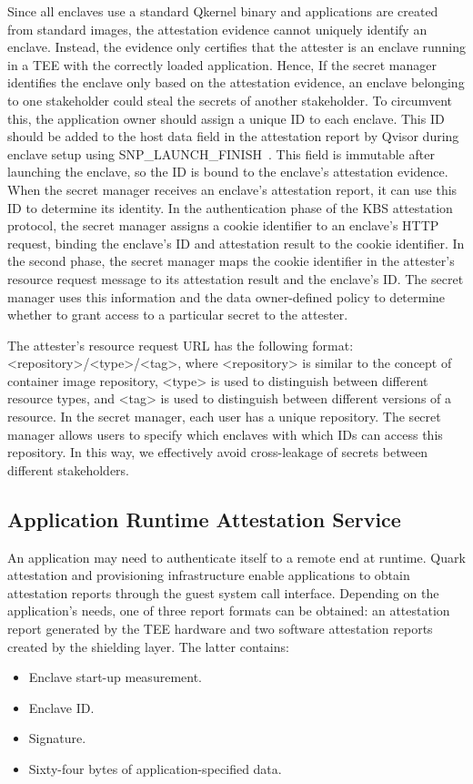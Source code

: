 Since all enclaves use a standard Qkernel binary and applications are created from standard images, the attestation evidence cannot uniquely identify an enclave. Instead, the evidence only certifies that the attester is an enclave running in a 
TEE with the correctly loaded application. Hence, If the secret manager identifies the enclave only based on the attestation evidence, an enclave belonging to one stakeholder could steal the secrets of another stakeholder. To circumvent this, 
the application owner should assign a unique ID to each enclave. This ID should be added to the host data field in the attestation report by Qvisor during enclave setup using SNP\_LAUNCH\_FINISH~\cite*{snp_firmware}. This field is immutable after launching the enclave, 
so the ID is bound to the enclave's attestation evidence. When the secret manager receives an enclave's attestation report, it can use this ID to determine its identity. In the authentication phase of the KBS attestation protocol, the secret 
manager assigns a cookie identifier to an enclave's HTTP request, binding the enclave's ID and attestation result to the cookie identifier. In the second phase, the secret manager maps the cookie identifier in the attester's resource request message 
to its attestation result and the enclave's ID. The secret manager uses this information and the data owner-defined policy to determine whether to grant access to a particular secret to the attester. 

The attester's resource request URL has the following format: <repository>/<type>/<tag>, where <repository> is similar to the concept of container image repository, <type> is used to distinguish between different resource types, and <tag> is used 
to distinguish between different versions of a resource. In the secret manager, each user has a unique repository. The secret manager allows users to specify which enclaves with which IDs can access this repository. In this way, we effectively avoid 
cross-leakage of secrets between different stakeholders.

\subsection{Application Runtime Attestation Service}

An application may need to authenticate itself to a remote end at runtime. Quark attestation and provisioning infrastructure enable applications to obtain attestation reports through the guest system call interface. 
Depending on the application's needs, one of three report formats can be obtained: an attestation report generated by the TEE hardware and two software attestation reports created by the shielding layer. The latter contains:
\begin{itemize}
    \item Enclave start-up measurement.
    \item Enclave ID.
    \item Signature.
    \item Sixty-four bytes of application-specified data.
  \end{itemize}

